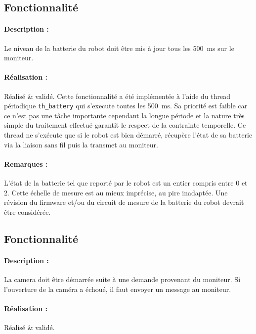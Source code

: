 \documentclass[11pt, a4paper]{paper}
\newcounter{cptreq}
\begin{document}
\subsection{Fonctionnalité \thecptreq}

\paragraph{Description :} Le niveau de la batterie du robot doit être mis à jour tous les 500~ms sur le moniteur.

\paragraph{\color{black}Réalisation :} {\color{black} Réalisé \& validé. Cette fonctionnalité a été implémentée à l'aide du thread périodique {\tt th\_battery} qui s'execute toutes les 500~ms.
Sa priorité est faible car ce n'est pas une tâche importante cependant la longue période et la nature très simple du traitement effectué garantit le respect de la contrainte temporelle. Ce thread ne s'exécute que si le robot est bien démarré, récupère l'état de sa batterie via la liaison sans fil puis la transmet au moniteur. }

\paragraph{\color{black}Remarques :} {\color{black} L'état de la batterie tel que reporté par le robot est un entier compris entre 0 et 2. Cette échelle de mesure est au mieux imprécise, au pire inadaptée. Une révision du firmware et/ou du circuit de mesure de la batterie du robot devrait être considérée.}

\subsection{Fonctionnalité \thecptreq}

\paragraph{Description :} La camera doit être démarrée suite à une demande provenant du moniteur. Si l'ouverture de la  caméra a échoué, il faut envoyer un message au moniteur.

\paragraph{\color{black}Réalisation :} {\color{black} Réalisé \& validé.}
\end{document}
